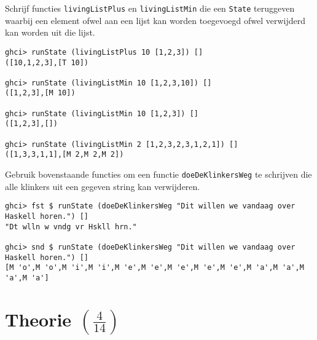 \documentclass[kulak]{kulakarticle}
\begin{document}
	Schrijf functies \texttt{livingListPlus} en \texttt{livingListMin} die een \texttt{State} teruggeven waarbij een element ofwel aan een lijst kan worden toegevoegd ofwel verwijderd kan worden uit die lijst.

	\begin{verbatim}
ghci> runState (livingListPlus 10 [1,2,3]) []
([10,1,2,3],[T 10])

ghci> runState (livingListMin 10 [1,2,3,10]) []
([1,2,3],[M 10])

ghci> runState (livingListMin 10 [1,2,3]) []
([1,2,3],[])

ghci> runState (livingListMin 2 [1,2,3,2,3,1,2,1]) []
([1,3,3,1,1],[M 2,M 2,M 2])

\end{verbatim}

	Gebruik bovenstaande functies om een functie \texttt{doeDeKlinkersWeg} te schrijven die alle klinkers uit een gegeven string kan verwijderen.

\begin{verbatim}
ghci> fst $ runState (doeDeKlinkersWeg "Dit willen we vandaag over Haskell horen.") []
"Dt wlln w vndg vr Hskll hrn."

ghci> snd $ runState (doeDeKlinkersWeg "Dit willen we vandaag over Haskell horen.") []
[M 'o',M 'o',M 'i',M 'i',M 'e',M 'e',M 'e',M 'e',M 'e',M 'a',M 'a',M 'a',M 'a']\end{verbatim}

	\newpage
	\section{Theorie \((\frac{4}{14})\)}
\end{document}
